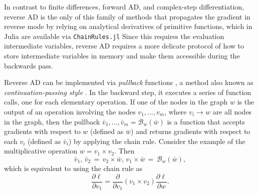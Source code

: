 In contrast to finite differences, forward AD, and complex-step differentiation, reverse AD is the only of this family of methods that propagates the gradient in reverse mode by relying on analytical derivatives of primitive functions, which in Julia are available via \texttt{ChainRules.jl}
Since this requires the evaluation intermediate variables, reverse AD requires a more delicate protocol of how to store intermediate variables in memory and make them accessible during the backwards pass. 

Reverse AD can be implemented via \textit{pullback} functions \cite{Innes_2018}, a method also known as \textit{continuation-passing style} \cite{Wang_Zheng_Decker_Wu_Essertel_Rompf_2019}.
In the backward step, it executes a series of function calls, one for each elementary operation.
If one of the nodes in the graph $w$ is the output of an operation involving the nodes $v_1, \ldots, v_m$, where $v_i \rightarrow w$ are all nodes in the graph, then the pullback $\bar v_1, \ldots, \bar v_m = \mathcal B_w(\bar w)$ is a function that accepts gradients with respect to $w$ (defined as $\bar w$) and returns gradients with respect to each $v_i$ (defined as $\bar v_i$) by applying the chain rule. 
Consider the example of the multiplicative operation $w = v_1 \times v_2$. Then
\begin{equation}
 \bar v_1, \, \bar v_2 
 \,=\,
 v_2 \times \bar w , \,
 v_1 \times \bar w 
 \,=\,
 \mathcal{B}_w (\bar w),
\end{equation}
which is equivalent to using the chain rule as
\begin{equation}
 \frac{\partial \ell}{\partial v_1} = \frac{\partial}{\partial v_1}(v_1 \times v_2) \frac{\partial \ell}{\partial w}.
\end{equation}



